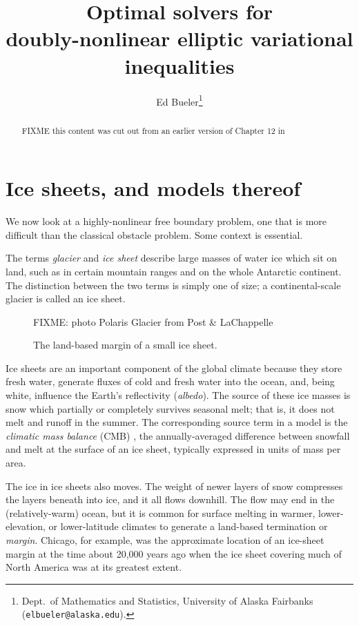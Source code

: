 \documentclass[final,leqno,onefignum,onetabnum]{siamltex1213bueler}
\title{Optimal solvers for \\ doubly-nonlinear elliptic variational inequalities}
\author{Ed Bueler\thanks{Dept.~of Mathematics and Statistics, University of Alaska Fairbanks \,\, (\texttt{elbueler@alaska.edu}).}}
\begin{document}
\maketitle
{}

\begin{abstract}
FIXME this content was cut out from an earlier version of Chapter 12 in \cite{Buelerbook}
\end{abstract}


\pagestyle{myheadings}
\thispagestyle{plain}

\section{Ice sheets, and models thereof}

We now look at a highly-nonlinear free boundary problem, one that is more difficult than the classical obstacle problem.  Some context is essential.

The terms \emph{glacier} and \emph{ice sheet} describe large masses of water ice which sit on land, such as in certain mountain ranges and on the whole Antarctic continent.  The distinction between the two terms is simply one of size; a continental-scale glacier is called an ice sheet.


\begin{figure}[h]
\begin{center}
FIXME: photo Polaris Glacier from Post \& LaChappelle
\end{center}
\caption{The land-based margin of a small ice sheet.}
\label{fig:co:polaris}
\end{figure}

Ice sheets are an important component of the global climate because they store fresh water, generate fluxes of cold and fresh water into the ocean, and, being white, influence the Earth's reflectivity (\emph{albedo}).  The source of these ice masses is snow which partially or completely survives seasonal melt; that is, it does not melt and runoff in the summer.  The corresponding source term in a model is the \emph{climatic mass balance} (CMB) \cite{Cogleyetal2011}, the annually-averaged difference between snowfall and melt at the surface of an ice sheet, typically expressed in units of mass per area.

The ice in ice sheets also moves.  The weight of newer layers of snow compresses the layers beneath into ice, and it all flows downhill.  The flow may end in the (relatively-warm) ocean, but it is common for surface melting in warmer, lower-elevation, or lower-latitude climates to generate a land-based termination or \emph{margin}.  Chicago, for example, was the approximate location of an ice-sheet margin at the time about 20,000 years ago when the ice sheet covering much of North America was at its greatest extent.
\end{document}
